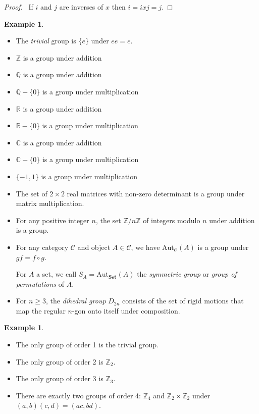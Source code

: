 \documentclass{book}
\let\qed\relax
\theoremstyle{definition}
\newtheorem{ex}[prop]{Example}
\newcommand{\Set}{\ensuremath{\mathbf{Set}}}
\newcommand{\Aut}[2]{\ensuremath{\mathrm{Aut}_{#1} \left( {#2} \right)}}
\begin{document}
\begin{proof}
    \pf\ If $i$ and $j$ are inverses of $x$ then $i = ixj = j$. \qed
\end{proof}

\begin{ex}
    \begin{itemize}
        \item
    The \emph{trivial} group is $\{e\}$ under $ee = e$.
    \item $\mathbb{Z}$ is a group under addition %
    \item $\mathbb{Q}$ is a group under addition %
    \item $\mathbb{Q} - \{0\}$ is a group under multiplication
    \item $\mathbb{R}$ is a group under addition %
    \item $\mathbb{R} - \{0\}$ is a group under multiplication
    \item $\mathbb{C}$ is a group under addition %
    \item $\mathbb{C} - \{0\}$ is a group under multiplication
    \item $\{-1,1\}$ is a group under multiplication
    \item The set of $2 \times 2$ real matrices with non-zero determinant is a group under matrix multiplication.
    \item For any positive integer $n$, the set $\mathbb{Z} / n \mathbb{Z}$ of integers modulo $n$ under addition is a group.
    \item For any category $\mathcal{C}$ and object $A \in \mathcal{C}$, we have $\Aut{\mathcal{C}}{A}$ is a group under $gf = f \circ g$.

    For $A$ a set, we call $S_A = \Aut{\Set}{A}$ the \emph{symmetric group} or \emph{group of permutations} of $A$.

    \item For $n \geq 3$, the \emph{dihedral group} $D_{2n}$ consists of the set of rigid motions that map the regular $n$-gon onto itself under composition.
    \end{itemize}
\end{ex}

\begin{ex}
    \begin{itemize}
        \item The only group of order 1 is the trivial group.
        \item The only group of order 2 is $\mathbb{Z}_2$.
        \item The only group of order 3 is $\mathbb{Z}_3$.
        \item There are exactly two groups of order 4: $\mathbb{Z}_4$ and $\mathbb{Z}_2 \times \mathbb{Z}_2$ under $(a,b) (c,d) = (ac,bd)$.
    \end{itemize}
\end{ex}
\end{document}
